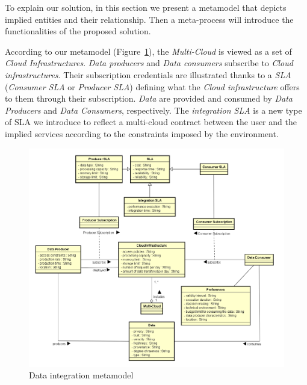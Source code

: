 To explain our solution, in this section we present a metamodel that depicts implied entities and their relationship. 
Then a meta-process will introduce the functionalities of the proposed solution.

According to our metamodel (Figure~\ref{fig:scenario}), the \textsl{Multi-Cloud} is viewed as a set of \textsl{Cloud Infrastructures}. \textsl{Data producers} and \textsl{Data consumers} subscribe to \textsl{Cloud infrastructures}. 
Their subscription credentials are illustrated thanks to a \textsl{SLA} (\textsl{Consumer SLA} or \textsl{Producer SLA}) defining what the \textsl{Cloud infrastructure} offers to them through their subscription. 
\textsl{Data} are provided and consumed by \textsl{Data Producers} and \textsl{Data Consumers}, respectively. The \textsl{integration SLA} is a new type of SLA we introduce to reflect a multi-cloud contract between the user and the implied services according to the constraints imposed by the environment. 

\begin{figure}[th!]
\center
\includegraphics[scale=0.43]{metamodel.pdf}
\caption{Data integration metamodel}\label{fig:scenario}
\end{figure}

